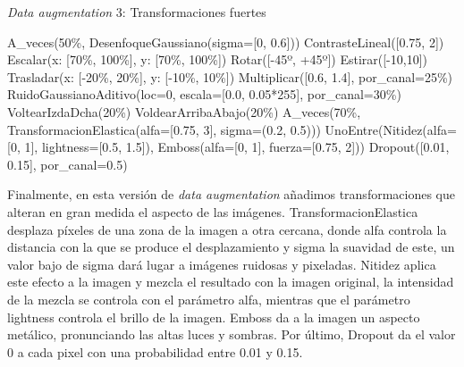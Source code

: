 \begin{algorithm}[H]
    \caption{\textit{Data augmentation} 3: Transformaciones fuertes}
\begin{algorithmic}[1]
    \State A\_veces(50\%, DesenfoqueGaussiano(sigma=[0, 0.6]))
    \State ContrasteLineal([0.75, 2])
    \State Escalar(x: [70\%, 100\%], y: [70\%, 100\%])
    \State Rotar([-45º, +45º])
    \State Estirar([-10,10])
    \State Trasladar(x: [-20\%, 20\%], y: [-10\%, 10\%])
    \State Multiplicar([0.6, 1.4], por\_canal=25\%)
    \State RuidoGaussianoAditivo(loc=0, escala=[0.0, 0.05*255], por\_canal=30\%)
    \State VoltearIzdaDcha(20\%)
    \State VoldearArribaAbajo(20\%)
    \State A\_veces(70\%, TransformacionElastica(alfa=[0.75, 3], sigma=(0.2, 0.5)))
    \State UnoEntre(Nitidez(alfa=[0, 1], lightness=[0.5, 1.5]), Emboss(alfa=[0, 1], fuerza=[0.75, 2]))
    \State Dropout([0.01, 0.15], por\_canal=0.5)
\end{algorithmic}
\end{algorithm}

Finalmente, en esta versión de \textit{data augmentation} añadimos transformaciones que alteran en gran medida el aspecto de las imágenes. TransformacionElastica desplaza píxeles de una zona de la imagen a otra cercana, donde alfa controla la distancia con la que se produce el desplazamiento y sigma la suavidad de este, un valor bajo de sigma dará lugar a imágenes ruidosas y pixeladas. Nitidez aplica este efecto a la imagen y mezcla el resultado con la imagen original, la intensidad de la mezcla se controla con el parámetro alfa, mientras que el parámetro lightness controla el brillo de la imagen. Emboss da a la imagen un aspecto metálico, pronunciando las altas luces y sombras. Por último, Dropout da el valor 0 a cada pixel con una probabilidad entre 0.01 y 0.15. 




